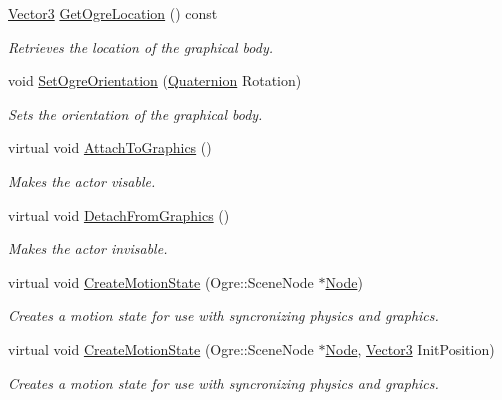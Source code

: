 \begin{DoxyCompactItemize}
\hyperlink{classphys_1_1Vector3}{Vector3} \hyperlink{classphys_1_1ActorBase_a12ef0a2625e2fdf506ea8e23e0a378fa}{GetOgreLocation} () const 
\begin{DoxyCompactList}\small\item\em Retrieves the location of the graphical body. \item\end{DoxyCompactList}\item 
void \hyperlink{classphys_1_1ActorBase_a7b2d13cb1e8bba60eeae782a53fd5e49}{SetOgreOrientation} (\hyperlink{classphys_1_1Quaternion}{Quaternion} Rotation)
\begin{DoxyCompactList}\small\item\em Sets the orientation of the graphical body. \item\end{DoxyCompactList}\item 
virtual void \hyperlink{classphys_1_1ActorBase_a45f190cb9b647bb3385d1298f9dab589}{AttachToGraphics} ()
\begin{DoxyCompactList}\small\item\em Makes the actor visable. \item\end{DoxyCompactList}\item 
virtual void \hyperlink{classphys_1_1ActorBase_acc352d14b6d7f15694ea108ec1c281ec}{DetachFromGraphics} ()
\begin{DoxyCompactList}\small\item\em Makes the actor invisable. \item\end{DoxyCompactList}\item 
virtual void \hyperlink{classphys_1_1ActorBase_a23e6edcd5c18b89c40abf02feba6bc11}{CreateMotionState} (Ogre::SceneNode $\ast$\hyperlink{classphys_1_1Node}{Node})
\begin{DoxyCompactList}\small\item\em Creates a motion state for use with syncronizing physics and graphics. \item\end{DoxyCompactList}\item 
virtual void \hyperlink{classphys_1_1ActorBase_a5bc2f834d7994c3c6a9408f4ff699f59}{CreateMotionState} (Ogre::SceneNode $\ast$\hyperlink{classphys_1_1Node}{Node}, \hyperlink{classphys_1_1Vector3}{Vector3} InitPosition)
\begin{DoxyCompactList}\small\item\em Creates a motion state for use with syncronizing physics and graphics. \item\end{DoxyCompactList}\item 

\end{DoxyCompactItemize}
